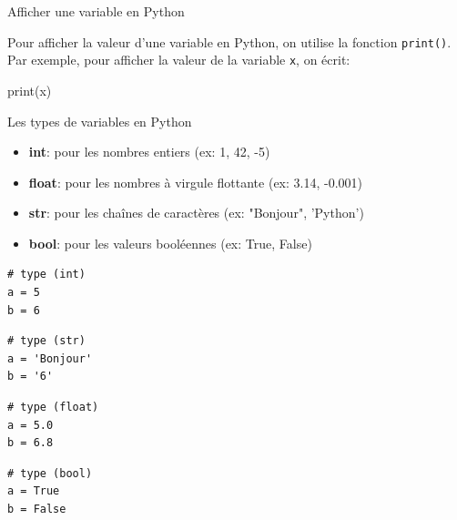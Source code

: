 \begin{easybox}{Afficher une variable en Python}

	Pour afficher la valeur d'une variable en Python, on utilise la fonction \texttt{print()}. Par exemple, pour afficher la valeur de la variable \texttt{x}, on écrit:

\begin{minipage}{0.48\linewidth}
	\begin{CodePythontexAlt}[Largeur=1\linewidth,Centre,Lignes=true,PremLigne=1, Lignes=false,]{}
    print(x)
    \end{CodePythontexAlt}
\end{minipage}\hfill{}
\begin{minipage}{0.48\linewidth}
\begin{scratch}
\end{scratch}
\end{minipage}
\end{easybox}

\begin{easybox}{Les types de variables en Python}
	\begin{itemize}
		\item \textbf{int}: pour les nombres entiers (ex: 1, 42, -5)
		\item \textbf{float}: pour les nombres à virgule flottante (ex: 3.14, -0.001)
		\item \textbf{str}: pour les chaînes de caractères (ex: "Bonjour", 'Python')
		\item \textbf{bool}: pour les valeurs booléennes (ex: True, False)
	\end{itemize}
\end{easybox}

\begin{minipage}{0.19\linewidth}
\begin{lstlisting}[numbers=none]
# type (int)
a = 5
b = 6
\end{lstlisting}
    \end{minipage}\hfill
    \begin{minipage}{0.19\linewidth}    
\begin{lstlisting}[numbers=none]   
# type (str)
a = 'Bonjour'
b = '6'   
\end{lstlisting}    
    \end{minipage}\hfill
    \begin{minipage}{0.19\linewidth}    
\begin{lstlisting}[numbers=none] 
# type (float)
a = 5.0 
b = 6.8
\end{lstlisting}    
    \end{minipage}\hfill{}
\begin{minipage}{0.19\linewidth}    
\begin{lstlisting}[numbers=none]  
# type (bool)
a = True
b = False
\end{lstlisting}    
    \end{minipage}

